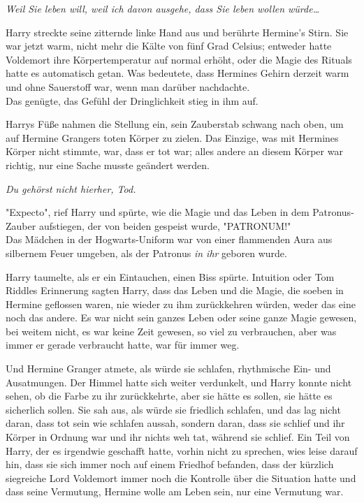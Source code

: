 {\emph{Weil Sie leben will, weil ich davon ausgehe, dass Sie leben wollen würde…}

Harry streckte seine zitternde linke Hand aus und berührte Hermine's Stirn. Sie war jetzt warm, nicht mehr die Kälte von fünf Grad Celsius; entweder hatte Voldemort ihre Körpertemperatur auf normal erhöht, oder die Magie des Rituals hatte es automatisch getan. Was bedeutete, dass Hermines Gehirn derzeit warm und ohne Sauerstoff war, wenn man darüber nachdachte.\\ Das genügte, das Gefühl der Dringlichkeit stieg in ihm auf.

Harrys Füße nahmen die Stellung ein, sein Zauberstab schwang nach oben, um auf Hermine Grangers toten Körper zu zielen. Das Einzige, was mit Hermines Körper nicht stimmte, war, dass er tot war; alles andere an diesem Körper war richtig, nur eine Sache musste geändert werden.

\emph{Du gehörst nicht hierher, Tod.}

"Expecto", rief Harry und spürte, wie die Magie und das Leben in dem Patronus-Zauber aufstiegen, der von beiden gespeist wurde, "PATRONUM!"\\

Das Mädchen in der Hogwarts-Uniform war von einer flammenden Aura aus silbernem Feuer umgeben, als der Patronus \emph{in ihr} geboren wurde.

Harry taumelte, als er ein Eintauchen, einen Biss spürte. Intuition oder Tom Riddles Erinnerung sagten Harry, dass das Leben und die Magie, die soeben in Hermine geflossen waren, nie wieder zu ihm zurückkehren würden, weder das eine noch das andere. Es war nicht sein ganzes Leben oder seine ganze Magie gewesen, bei weitem nicht, es war keine Zeit gewesen, so viel zu verbrauchen, aber was immer er gerade verbraucht hatte, war für immer weg.

Und Hermine Granger atmete, als würde sie schlafen, rhythmische Ein- und Ausatmungen. Der Himmel hatte sich weiter verdunkelt, und Harry konnte nicht sehen, ob die Farbe zu ihr zurückkehrte, aber sie hätte es sollen, sie hätte es sicherlich sollen. Sie sah aus, als würde sie friedlich schlafen, und das lag nicht daran, dass tot sein wie schlafen aussah, sondern daran, dass sie schlief und ihr Körper in Ordnung war und ihr nichts weh tat, während sie schlief. Ein Teil von Harry, der es irgendwie geschafft hatte, vorhin nicht zu sprechen, wies leise darauf hin, dass sie sich immer noch auf einem Friedhof befanden, dass der kürzlich siegreiche Lord Voldemort immer noch die Kontrolle über die Situation hatte und dass seine Vermutung, Hermine wolle am Leben sein, nur eine Vermutung war.

}
